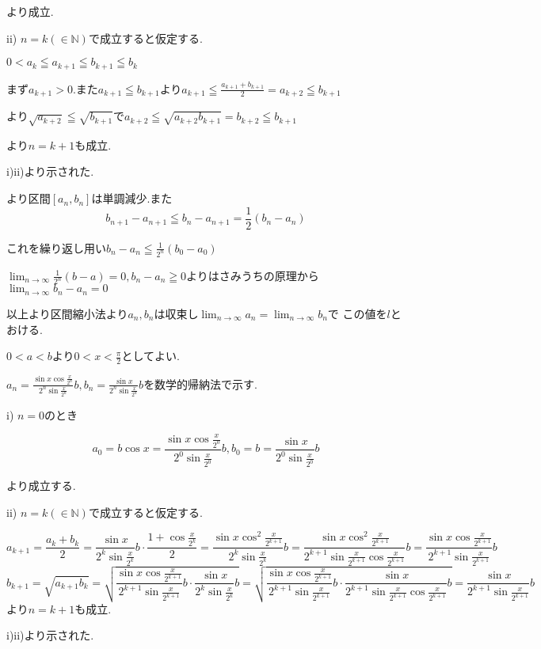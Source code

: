 \documentclass{jsarticle}
\begin{document}
より成立.

ii) $n=k(\in\mathbb{N})$で成立すると仮定する.

$0<a_k\leqq a_{k+1}\leqq b_{k+1} \leqq b_k$

まず$a_{k+1}>0$.また$a_{k+1}\leqq b_{k+1}$より$a_{k+1}\leqq \frac{a_{k+1}+b_{k+1}}{2}=a_{k+2}\leqq b_{k+1}$

より$\sqrt{a_{k+2}} \leqq \sqrt{b_{k+1}}$で$a_{k+2}\leqq\sqrt{a_{k+2}b_{k+1}}=b_{k+2}\leqq b_{k+1}$

より$n=k+1$も成立.

i)ii)より示された.

より区間$[a_n,b_n]$は単調減少.また
\[b_{n+1}-a_{n+1}\leqq b_n-a_{n+1}=\frac{1}{2}(b_n-a_n)\]

これを繰り返し用い$b_n-a_n\leqq \frac{1}{2^n}(b_0-a_0)$

$\displaystyle \lim_{n\to\infty}\frac{1}{2^n}(b-a)=0,b_n-a_n\geqq 0$よりはさみうちの原理から$\displaystyle \lim_{n\to\infty}b_n-a_n=0$

以上より区間縮小法より$a_n,b_n$は収束し$\displaystyle \lim_{n\to \infty}a_n=\lim_{n\to\infty}b_n$で
この値を$l$とおける.

$0<a<b$より$0<x<\frac{\pi}{2}$としてよい.

$a_n = \frac{\sin x\cos \frac{x}{2^n}}{2^n\sin \frac{x}{2^n}}b,b_n= \frac{\sin x}{2^n\sin \frac{x}{2^n}}b$を数学的帰納法で示す.

i) $n=0$のとき

\[a_0=b\cos x = \frac{\sin x \cos \frac{x}{2^0}}{2^0\sin\frac{x}{2^0}}b,
b_0=b = \frac{\sin x}{2^0\sin\frac{x}{2^0}}b \]

より成立する.

ii) $n=k(\in \mathbb{N})$で成立すると仮定する.

\[a_{k+1}=\frac{a_k+b_k}{2}=\frac{\sin x}{2^k\sin \frac{x}{2^k}}b\cdot \frac{1+\cos \frac{x}{2^k}}{2}= \frac{\sin x\cos ^2 \frac{x}{2^{k+1}}}{2^k\sin \frac{x}{2^k}}b= \frac{\sin x\cos ^2 \frac{x}{2^{k+1}}}{2^{k+1}\sin \frac{x}{2^{k+1}}\cos \frac{x}{2^{k+1}}}b=\frac{\sin x\cos \frac{x}{2^{k+1}}}{2^{k+1}\sin \frac{x}{2^{k+1}}}b\]
\[b_{k+1}=\sqrt{a_{k+1}b_k}=\sqrt{\frac{\sin x\cos \frac{x}{2^{k+1}}}{2^{k+1}\sin \frac{x}{2^{k+1}}}b\cdot \frac{\sin x}{2^k\sin \frac{x}{2^k}}b}=\sqrt{\frac{\sin x\cos \frac{x}{2^{k+1}}}{2^{k+1}\sin \frac{x}{2^{k+1}}}b\cdot \frac{\sin x}{2^{k+1}\sin \frac{x}{2^{k+1}}\cos \frac{x}{2^{k+1}}}b}= \frac{\sin x}{2^{k+1}\sin \frac{x}{2^{k+1}}}b\]
より$n=k+1$も成立.

i)ii)より示された.
\end{document}
